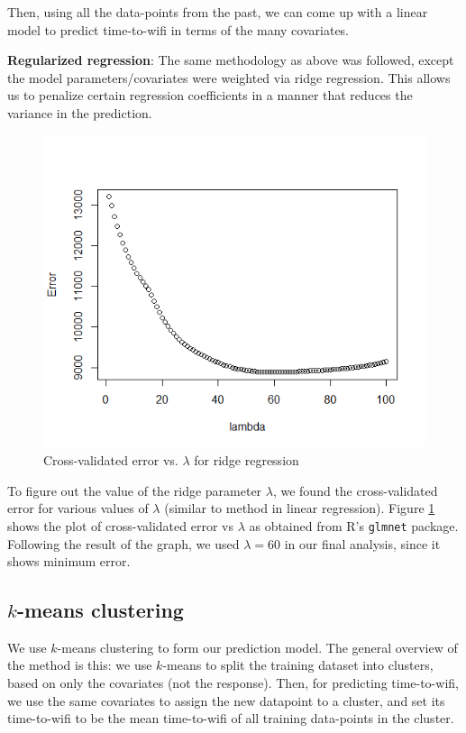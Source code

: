 \documentclass[12pt, fleqn]{article}
\begin{document}
Then, using all the data-points from the past, we can come up with a linear model 
to predict time-to-wifi in terms of the many covariates. 

\bigskip
\textbf{Regularized regression}:	The same methodology as above was followed, except 
the model parameters/covariates were weighted via ridge regression. This allows 
us to penalize certain regression coefficients in a manner that reduces the variance in the 
prediction.

\medskip
\begin{figure}[htp]
\centering
\includegraphics[scale=0.5]{img/ridge_lambda.png}
\caption{Cross-validated error vs. $\lambda$ for ridge regression\label{fig-ridge-lambda}}
\end{figure}
\medskip

To figure out the value of the ridge parameter $\lambda$, we found the cross-validated error
for various values of $\lambda$ (similar to method in linear regression). 
Figure \ref{fig-ridge-lambda} shows the plot of 
cross-validated error vs $\lambda$ as obtained from R’s \texttt{glmnet} package. Following the result of 
the graph, we used $\lambda = 60$ in our final analysis, since it shows minimum 
error. 

\subsection{$k$-means clustering}
\label{time-to-wifi-kmeans}

We use $k$-means clustering to form our prediction model. The general overview of the method is this:
we use $k$-means to split the training dataset into clusters, based on only the covariates 
(not the response). Then, for predicting time-to-wifi, we use the same covariates to assign 
the new datapoint to a cluster, and set its time-to-wifi to be the mean 
time-to-wifi of all training data-points in the cluster.
\end{document}

